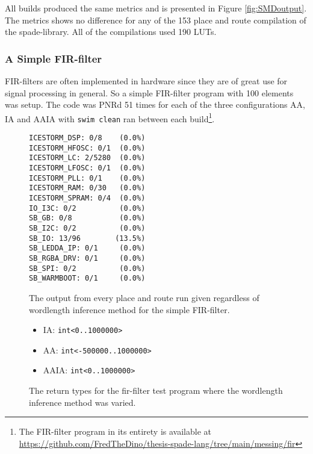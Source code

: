 All builds produced the same metrics and is presented in Figure \ref{fig:SMDoutput}. The metrics shows no difference for any of the 153 place and route compilation of the spade-library. All of the compilations used 190 LUTs. 

\subsubsection{A Simple FIR-filter}
FIR-filters are often implemented in hardware since they are of great use for signal processing in general. So a simple FIR-filter program with 100 elements was setup. The code was PNRd 51 times for each of the three configurations AA, IA and AAIA with \verb+swim clean+ ran between each build\cprotect\footnote{The FIR-filter program in its entirety is available at \href{https://github.com/FredTheDino/thesis-spade-lang/tree/main/messing/fir}{https://github.com/FredTheDino/thesis-spade-lang/tree/main/messing/fir}}.

\begin{figure}
\begin{center}
\begin{verbatim}
ICESTORM_DSP: 0/8    (0.0%)
ICESTORM_HFOSC: 0/1  (0.0%)
ICESTORM_LC: 2/5280  (0.0%)
ICESTORM_LFOSC: 0/1  (0.0%)
ICESTORM_PLL: 0/1    (0.0%)
ICESTORM_RAM: 0/30   (0.0%)
ICESTORM_SPRAM: 0/4  (0.0%)
IO_I3C: 0/2          (0.0%)
SB_GB: 0/8           (0.0%)
SB_I2C: 0/2          (0.0%)
SB_IO: 13/96        (13.5%)
SB_LEDDA_IP: 0/1     (0.0%)
SB_RGBA_DRV: 0/1     (0.0%)
SB_SPI: 0/2          (0.0%)
SB_WARMBOOT: 0/1     (0.0%)
\end{verbatim}
\end{center}

  \caption{The output from every place and route run given regardless of wordlength inference method for the simple FIR-filter.}
  \label{fig:FIRoutput}
\end{figure}

\begin{figure}
\begin{itemize}
  \item IA: \verb+int<0..1000000>+
  \item AA: \verb+int<-500000..1000000>+
  \item AAIA: \verb+int<0..1000000>+
\end{itemize}
  \caption{The return types for the fir-filter test program where the wordlength inference method was varied.}
  \label{figRangeRes}
\end{figure}

